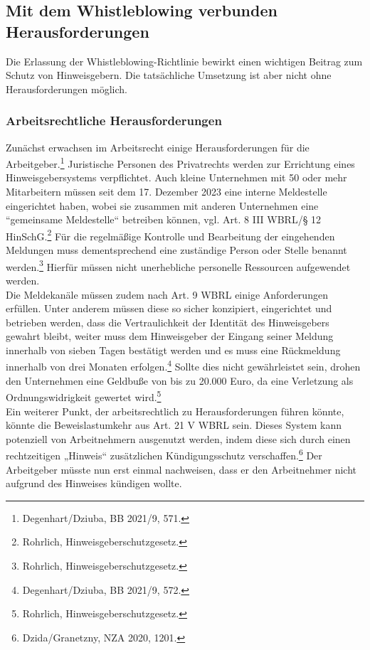 \subsection{Mit dem Whistleblowing verbunden Herausforderungen}
Die Erlassung der Whistleblowing-Richtlinie bewirkt einen wichtigen Beitrag zum Schutz von Hinweisgebern. Die tatsächliche Umsetzung ist aber nicht ohne Herausforderungen möglich.

\subsubsection{Arbeitsrechtliche Herausforderungen}
Zunächst erwachsen im Arbeitsrecht einige Herausforderungen für die Arbeitgeber.\footnote{Degenhart/Dziuba, BB 2021/9, 571.}
Juristische Personen des Privatrechts werden zur Errichtung eines Hinweisgebersystems verpflichtet.
Auch kleine Unternehmen mit 50 oder mehr Mitarbeitern müssen seit dem 17. Dezember 2023 eine interne Meldestelle eingerichtet haben, wobei sie zusammen mit anderen Unternehmen eine “gemeinsame Meldestelle“ betreiben können, vgl. Art. 8 III WBRL/§ 12 HinSchG.\footnote{Rohrlich, Hinweisgeberschutzgesetz.}
Für die regelmäßige Kontrolle und Bearbeitung der eingehenden Meldungen muss dementsprechend eine zuständige Person oder Stelle benannt werden.\footnote{Rohrlich, Hinweisgeberschutzgesetz.}
Hierfür müssen nicht unerhebliche personelle Ressourcen aufgewendet werden.\\
Die Meldekanäle müssen zudem nach Art. 9 WBRL einige Anforderungen erfüllen. 
Unter anderem müssen diese so sicher konzipiert, eingerichtet und betrieben werden, dass die Vertraulichkeit der Identität des Hinweisgebers gewahrt bleibt, weiter muss dem Hinweisgeber der Eingang seiner Meldung innerhalb von sieben Tagen bestätigt werden und es muss eine Rückmeldung innerhalb von drei Monaten erfolgen.\footnote{Degenhart/Dziuba, BB 2021/9, 572.}
Sollte dies nicht gewährleistet sein, drohen den Unternehmen eine Geldbuße von bis zu 20.000 Euro, da eine Verletzung als Ordnungswidrigkeit gewertet wird.\footnote{Rohrlich, Hinweisgeberschutzgesetz.}\\
Ein weiterer Punkt, der arbeitsrechtlich zu Herausforderungen führen könnte, könnte die Beweislastumkehr aus Art. 21 V WBRL sein.
Dieses System kann potenziell von Arbeitnehmern ausgenutzt werden, indem diese sich durch einen rechtzeitigen „Hinweis“ zusätzlichen Kündigungsschutz verschaffen.\footnote{Dzida/Granetzny, NZA 2020, 1201.}
Der Arbeitgeber müsste nun erst einmal nachweisen, dass er den Arbeitnehmer nicht aufgrund des Hinweises kündigen wollte.
